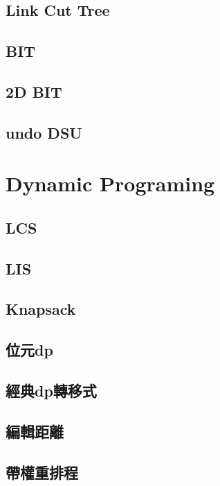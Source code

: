 \subsection{Link Cut Tree}

\subsection{BIT}

\subsection{2D BIT}

\subsection{undo DSU}


\section{Dynamic Programing}
\subsection{LCS}

\subsection{LIS}

\subsection{Knapsack}

\subsection{位元dp}

\subsection{經典dp轉移式}

\subsection{編輯距離}

\subsection{帶權重排程}


